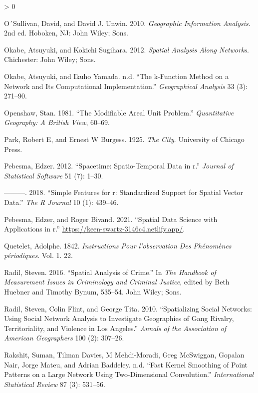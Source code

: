 \documentclass[
  krantz2]{krantz}
\newlength{\cslhangindent}
\newenvironment{CSLReferences}[2] %
 {%
  \setlength{\parindent}{0pt}
  \ifodd #1 \everypar{\setlength{\hangindent}{\cslhangindent}}\ignorespaces\fi
  \ifnum #2 > 0
  \setlength{\parskip}{#2\baselineskip}
  \fi
 }%
 {}
\begin{document}
\begin{CSLReferences}{1}{0}
\leavevmode\hypertarget{ref-OSullivan_2010}{}%
O´Sullivan, David, and David J. Unwin. 2010. \emph{Geographic Information Analysis}. 2nd ed. Hoboken, NJ: John Wiley; Sons.

\leavevmode\hypertarget{ref-Okabe_2012}{}%
Okabe, Atsuyuki, and Kokichi Sugihara. 2012. \emph{Spatial Analysis Along Networks}. Chichester: John Wiley; Sons.

\leavevmode\hypertarget{ref-Okabe_2001}{}%
Okabe, Atsuyuki, and Ikuho Yamada. n.d. {``The k-Function Method on a Network and Its Computational Implementation.''} \emph{Geographical Analysis} 33 (3): 271--90.

\leavevmode\hypertarget{ref-Openshaw_1981}{}%
Openshaw, Stan. 1981. {``The Modifiable Areal Unit Problem.''} \emph{Quantitative Geography: A British View}, 60--69.

\leavevmode\hypertarget{ref-Park_1925}{}%
Park, Robert E, and Ernest W Burgess. 1925. \emph{The City}. University of Chicago Press.

\leavevmode\hypertarget{ref-Pebesma_2012}{}%
Pebesma, Edzer. 2012. {``Spacetime: Spatio-Temporal Data in r.''} \emph{Journal of Statistical Software} 51 (7): 1--30.

\leavevmode\hypertarget{ref-Pebesma_2018}{}%
---------. 2018. {``Simple Features for r: Standardized Support for Spatial Vector Data.''} \emph{The R Journal} 10 (1): 439--46.

\leavevmode\hypertarget{ref-Pebesma_2021}{}%
Pebesma, Edzer, and Roger Bivand. 2021. {``Spatial Data Science with Applications in r.''} \url{https://keen-swartz-3146c4.netlify.app/}.

\leavevmode\hypertarget{ref-Quetelet_1842}{}%
Quetelet, Adolphe. 1842. \emph{Instructions Pour l'observation Des Ph{é}nom{è}nes p{é}riodiques}. Vol. 1. 22.

\leavevmode\hypertarget{ref-Radil_2016}{}%
Radil, Steven. 2016. {``Spatial Analysis of Crime.''} In \emph{The Handbook of Measurement Issues in Criminology and Criminal Justice}, edited by Beth Huebner and Timothy Bynum, 535--54. John Wiley; Sons.

\leavevmode\hypertarget{ref-Radil_2010}{}%
Radil, Steven, Colin Flint, and George Tita. 2010. {``Spatializing Social Networks: Using Social Network Analysis to Investigate Geographies of Gang Rivalry, Territoriality, and Violence in Los Angeles.''} \emph{Annals of the Association of American Geographers} 100 (2): 307--26.

\leavevmode\hypertarget{ref-Rakshit_2019}{}%
Rakshit, Suman, Tilman Davies, M Mehdi-Moradi, Greg McSwiggan, Gopalan Nair, Jorge Mateu, and Adrian Baddeley. n.d. {``Fast Kernel Smoothing of Point Patterns on a Large Network Using Two-Dimensional Convolution.''} \emph{International Statistical Review} 87 (3): 531--56.


\end{CSLReferences}
\end{document}
